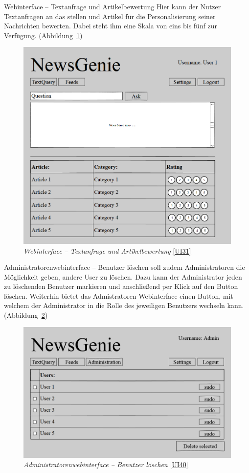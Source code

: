 
\begin{ui}{31}{Webinterface -- Textanfrage und Artikelbewertung}
Hier kann der Nutzer Textanfragen an das \NewsGenie stellen und Artikel für die Personalisierung seiner Nachrichten bewerten. Dabei steht ihm eine Skala von eins bis fünf zur Verfügung.
(Abbildung~\ref{fig:wi-textquery})
\begin{figure}[ht]
\centering
\includegraphics[width=0.8\linewidth]{figures/webinterfaceTextQueryArticleRating.png}
\caption{\textit{Webinterface -- Textanfrage und Artikelbewertung} \ref{UI31}}
\label{fig:wi-textquery}
\end{figure}
\end{ui}


\begin{ui}{40}{Administratorenwebinterface -- Benutzer löschen}
\NewsGenie soll zudem Administratoren die Möglichkeit geben, andere User zu löschen. Dazu kann der Administrator jeden zu löschenden Benutzer markieren und anschließend per Klick auf den Button löschen. Weiterhin bietet das Admistratoren-Webinterface einen Button, mit welchem der Administrator in die Rolle des jeweiligen Benutzers wechseln kann.
(Abbildung~\ref{fig:wi-admin-deluser})
\begin{figure}[ht]
\centering
\includegraphics[width=0.8\linewidth]{figures/webinterfaceUserDelete.png}
\caption{\textit{Administratorenwebinterface -- Benutzer löschen} \ref{UI40}}
\label{fig:wi-admin-deluser}
\end{figure}
\end{ui}

